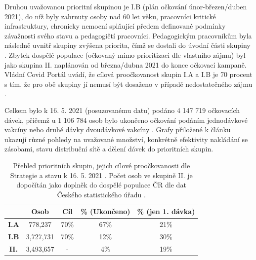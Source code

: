 %
Druhou uvažovanou prioritní skupinou je I.B (plán očkování únor-březen/duben 2021), do níž byly zahrnuty osoby nad 60 let věku, pracovníci kritické infrastruktury, chronicky nemocní splňující předem definované podmínky závažnosti svého stavu a pedagogičtí pracovníci. %
Pedagogickým pracovníkům byla následně uvnitř skupiny zvýšena priorita, čímž se dostali do úvodní části skupiny \cite{prioritizace_ockovani}. Zbytek dospělé populace (očkovaný mimo prioritizaci dle vlastního zájmu) byl jako skupina II. naplánován od března/dubna 2021 do konce očkovací kampaně. Vládní Covid Portál uvádí, že cílová proočkovanost skupin I.A a I.B je 70 procent s tím, že pro obě skupiny jí nemusí být dosaženo v případě nedostatečného zájmu \cite{kdoprvni}.

Celkem bylo k 16. 5. 2021 (posuzovanému datu) podáno 4 147 719 očkovacích dávek, přičemž u 1 106 784 osob bylo ukončeno očkování podáním jednodávkové vakcíny nebo druhé dávky dvoudávkové vakcíny \cite{mzcr_data}. Grafy přiložené k článku ukazují různé pohledy na uvažované množství, konkrétně efektivity nakládání se zásobami, stavu distribuční sítě a dělení dávek do prioritních skupin.



\begin{table}
\begin{minipage}{\textwidth} 
\begin{centering}
\begin{tabular}{|c|c|c|c|c|}
\hline
& \textbf{Osob} & \textbf{Cíl} & \textbf{\% (Ukončeno)} & \textbf{\% (jen 1. dávka)}  \\
\hline
\textbf{I.A} & 778,237 & 70\% & 67\% & 21\% \\
\hline
\textbf{I.B} & 3,727,731 & 70\% & 12\% & 30\%\\
\hline
\textbf{II.} & 3,493,657 & - & 4\% & 19\% \\
\hline
\end{tabular}
	\caption{Přehled prioritních skupin, jejich cílové proočkovanosti dle Strategie a stavu k 16. 5. 2021 \cite{strategie_covid}. Počet osob ve skupině II. je dopočítán jako doplněk do dospělé populace ČR dle dat Českého statistického úřadu \cite{obyvatele_pocet}.}
    \label{tab_skupiny}
    
    \end{centering}
\end{minipage}
\end{table}



